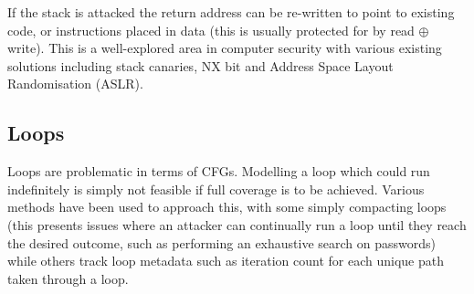 If the stack is attacked the return address can be re-written to point to existing code, or instructions placed in data (this is usually protected for by read $\oplus$ write). This is a well-explored area in computer security with various existing solutions including stack canaries, NX bit and Address Space Layout Randomisation (ASLR).

\subsection{Loops}
Loops are problematic in terms of CFGs. Modelling a loop which could run indefinitely is simply not feasible if full coverage is to be achieved. Various methods have been used to approach this, with some \cite{Abadi2005} simply compacting loops (this presents issues where an attacker can continually run a loop until they reach the desired outcome, such as performing an exhaustive search on passwords) while others \cite{Dessouky2017} track loop metadata such as iteration count for each unique path taken through a loop.